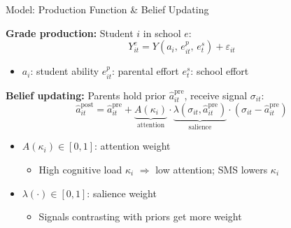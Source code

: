 \documentclass[aspectratio=169,11pt]{beamer}
\begin{document}
\begin{frame}{Model: Production Function \& Belief Updating}

\textbf{Grade production:} Student $i$ in school $e$:
\[
Y_{it}^{e} = Y(a_{i},\, e_{it}^{p},\, e_{t}^{s}) + \varepsilon_{it}
\]
\begin{itemize}
    \item $a_i$: student ability \quad $e_{it}^{p}$: parental effort \quad $e_{t}^{s}$: school effort
\end{itemize}

\bigskip

\textbf{Belief updating:} Parents hold prior $\hat{a}_{it}^{\text{pre}}$, receive signal $\sigma_{it}$:
\[
\hat{a}_{it}^{\text{post}} = \hat{a}_{it}^{\text{pre}}
  + \underbrace{A(\kappa_i)}_{\text{attention}} \cdot \underbrace{\lambda(\sigma_{it}, \hat{a}_{it}^{\text{pre}})}_{\text{salience}}
  \cdot (\sigma_{it} - \hat{a}_{it}^{\text{pre}})
\]

\begin{itemize}
    \item $A(\kappa_i) \in [0,1]$: attention weight \citep{gabaix2014sparsity}
    \begin{itemize}
        \item High cognitive load $\kappa_i$ $\Rightarrow$ low attention; SMS lowers $\kappa_i$
    \end{itemize}
    \item $\lambda(\cdot) \in [0,1]$: salience weight \citep{bordalo2012salience}
    \begin{itemize}
        \item Signals contrasting with priors get more weight
    \end{itemize}
\end{itemize}

\end{frame}

\end{document}
